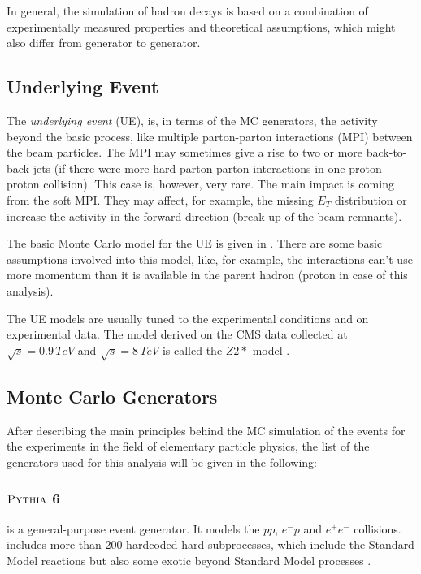 In general, the simulation of hadron decays is based on a combination of experimentally measured properties and theoretical assumptions, which
might also differ from generator to generator.

\subsection{Underlying Event}

The \textit{underlying event} (UE), is, in terms of the MC generators, the activity beyond the basic process, like multiple parton-parton interactions
(MPI) between the beam particles. The MPI may sometimes give a rise to two or more back-to-back jets (if there were more hard parton-parton interactions
in one proton-proton collision). This case is, however, very rare. The main impact is coming from the soft MPI. They may affect, for example, the 
missing $E_{T}$ distribution or increase the activity in the forward direction (break-up of the beam remnants).

The basic Monte Carlo model for the UE is given in \cite{PhysRevD.36.2019}. There are some basic assumptions involved into
this model, like, for example, the interactions can't use more momentum than it is available in the parent hadron (proton in case of this analysis).

The UE models are usually tuned to the experimental conditions and on experimental data. The model derived on the CMS data collected at $\sqrt{s} = 0.9\, TeV$
and $\sqrt{s} = 8\,TeV$ is called the $Z2*$ model \cite{Chatrchyan:2011id}.


\subsection{Monte Carlo Generators}

After describing the main principles behind the MC simulation of the events for the experiments in the field of elementary particle
physics, the list of the generators used for this analysis will be given in the following:

\subsubsection{$\textsc{Pythia}$ 6}

\PYTHIA \cite{Sjostrand:2006za} is a general-purpose event generator. It models the $pp$, $e^{-}p$ and $e^{+}e^{-}$ collisions. \PYTHIA includes more than 200 hardcoded
hard subprocesses, which include the Standard Model reactions but also some exotic beyond Standard Model processes \cite{Buckley:2011ms}.

